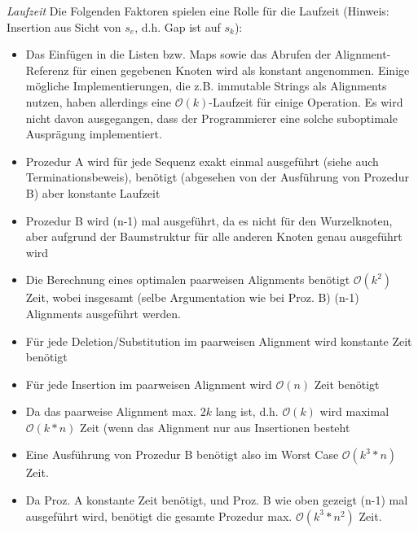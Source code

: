 \documentclass[a4paper,10pt,oneside,reqno]{scrartcl}
\begin{document}
\textit{Laufzeit}
Die Folgenden Faktoren spielen eine Rolle für die Laufzeit (Hinweis: Insertion aus Sicht von $s_e$, d.h. Gap ist auf $s_k$):
\begin{itemize}
 \item Das Einfügen in die Listen bzw. Maps sowie das Abrufen der Alignment-Referenz für einen gegebenen Knoten wird als konstant angenommen. Einige mögliche Implementierungen, die z.B. immutable Strings als Alignments nutzen, haben allerdings eine $\mathcal{O}(k)$-Laufzeit für einige Operation. Es wird nicht davon ausgegangen, dass der Programmierer eine solche suboptimale Ausprägung implementiert.
 \item Prozedur A wird für jede Sequenz exakt einmal ausgeführt (siehe auch Terminationsbeweis), benötigt (abgesehen von der Ausführung von Prozedur B) aber konstante Laufzeit
 \item Prozedur B wird (n-1) mal ausgeführt, da es nicht für den Wurzelknoten, aber aufgrund der Baumstruktur für alle anderen Knoten genau ausgeführt wird
 \item Die Berechnung eines optimalen paarweisen Alignments benötigt $\mathcal{O}(k^2)$ Zeit, wobei insgesamt (selbe Argumentation wie bei Proz. B) (n-1) Alignments ausgeführt werden.
 \item Für jede Deletion/Substitution im paarweisen Alignment wird konstante Zeit benötigt
 \item Für jede Insertion im paarweisen Alignment wird $\mathcal{O}(n)$ Zeit benötigt
 \item Da das paarweise Alignment max. $2k$ lang ist, d.h. $\mathcal{O}(k)$ wird maximal $\mathcal{O}(k*n)$ Zeit (wenn das Alignment nur aus Insertionen besteht
 \item Eine Ausführung von Prozedur B benötigt also im Worst Case $\mathcal{O}(k^3*n)$ Zeit.
 \item Da Proz. A konstante Zeit benötigt, und Proz. B wie oben gezeigt (n-1) mal ausgeführt wird, benötigt die gesamte Prozedur max. $\mathcal{O}(k^3*n^2)$ Zeit.
\end{itemize}
\end{document}
